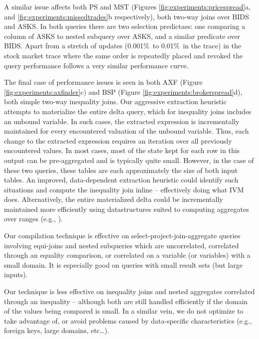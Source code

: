 A similar issue affects both PS and MST (Figures \ref{fig:experiments:pricespread}a, and \ref{fig:experiments:missedtrades}b respectively), both two-way joins over BIDS and ASKS.  In both queries there are two selection predictaes: one comparing a column of ASKS to nested subquery over ASKS, and a similar predicate over BIDS.  Apart from a stretch of updates (0.001\%\ to 0.01\%\ in the trace) in the stock market trace where the same order is repeatedly placed and revoked the query performance follows a very similar performance curve. 

The final case of performance issues is seen in both AXF (Figure \ref{fig:experiments:axfinder}c) and BSP (Figure \ref{fig:experiments:brokerspread}d), both simple two-way inequality joins.  Our aggressive extraction heuristic attempts to materialize the entire delta query, which for inequality joins includes an unbound variable.  In such cases, the extracted expression is incrementally maintained for every encountered valuation of the unbound variable.  Thus, each change to the extracted expression requires an iteration over all previously encountered values.  In most cases, most of the state kept for each row in this output can be pre-aggregated and is typically quite small.  However, in the case of these two queries, these tables are each approximately the size of both input tables.  An improved, data-dependent extraction heuristic could identify such situations and compute the inequality join inline -- effectively doing what IVM does.  Alternatively, the entire materialized delta could be incrementally maintained more efficiently using datastructures suited to computing aggregates over ranges (e.g., \cite{range trees}).

Our compilation technique is effective on select-project-join-aggregate queries involving equi-joins and nested subqueries which are uncorrelated, correlated through an equality comparison, or correlated on a variable (or variables) with a small domain.  It is especially good on queries with small result sets (but large inputs).

Our technique is less effective on inequality joins and nested aggregates correlated through an inequality -- although both are still handled efficiently if the domain of the values being compared is small.  In a similar vein, we do not optimize to take advantage of, or avoid problems caused by data-specific characteristics (e.g., foreign keys, large domains, etc\ldots). 



\begin{figure}
\begin{center}
\end{center}
\end{figure}



